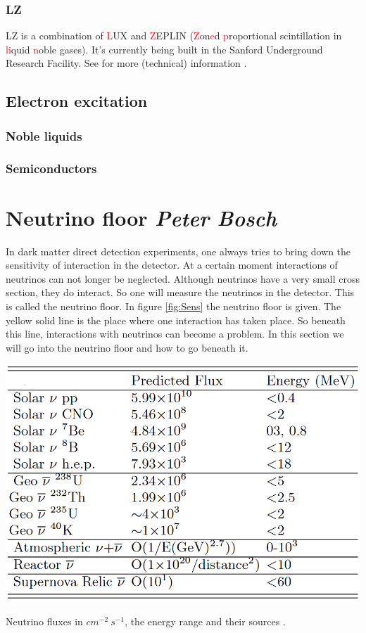 \documentclass{article}
\begin{document}
\subsubsection{LZ}
LZ is a combination of \textcolor{red}{L}UX and \textcolor{red}{Z}EPLIN (\textcolor{red}{Z}on\textcolor{red}{e}d \textcolor{red}{p}roportional scintillation in \textcolor{red}{li}quid \textcolor{red}{n}oble gases). It's currently being built in the Sanford Underground Research Facility. See for more (technical) information \cite{Akerib:2015cja,Mount:2017qzi}.

\subsection{Electron excitation}
\subsubsection{Noble liquids}
\subsubsection{Semiconductors}

 

\FloatBarrier
\section{Neutrino floor \small{\textit{Peter Bosch}}}
\label{sec:floor}
In dark matter direct detection experiments, one always tries to bring down the sensitivity of interaction in the detector. At a certain moment interactions of neutrinos can not longer be neglected. Although neutrinos have a very small cross section, they do interact. So one will measure the neutrinos in the detector. This is called the neutrino floor. In figure \ref{fig:Sens} the neutrino floor is given. The yellow solid line is the place where one interaction has taken place. So beneath this line, interactions with neutrinos can become a problem. In this section we will go into the neutrino floor and how to go beneath it.

\begin{table}[h!]
    \centering
    \includegraphics[width=.8\textwidth]{Neutrino_fluxes.PNG}
    \caption{Neutrino fluxes in $cm^{-2}\ s^{-1}$, the energy range and their sources \cite{Monroe:2007xp}.}
    \label{tab:neutrino_flux}
\end{table}
\end{document}
